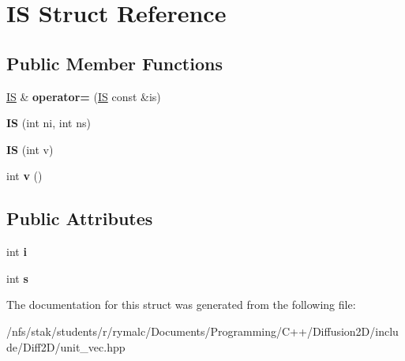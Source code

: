 \hypertarget{structIS}{
\section{IS Struct Reference}
\label{structIS}
}
\subsection*{Public Member Functions}
\begin{DoxyCompactItemize}
\item 
\hypertarget{structIS_aec66c50fd699031a1f617117c67eda11}{
\hyperlink{structIS}{IS} \& {\bfseries operator=} (\hyperlink{structIS}{IS} const \&is)}
\label{structIS_aec66c50fd699031a1f617117c67eda11}

\item 
\hypertarget{structIS_a2cb6d148c70406c11b9508be2cfddd7e}{
{\bfseries IS} (int ni, int ns)}
\label{structIS_a2cb6d148c70406c11b9508be2cfddd7e}

\item 
\hypertarget{structIS_a53883df04399eab305d240898e889271}{
{\bfseries IS} (int v)}
\label{structIS_a53883df04399eab305d240898e889271}

\item 
\hypertarget{structIS_ad474289c5f0f5f5b231cd2067547cc0f}{
int {\bfseries v} ()}
\label{structIS_ad474289c5f0f5f5b231cd2067547cc0f}

\end{DoxyCompactItemize}
\subsection*{Public Attributes}
\begin{DoxyCompactItemize}
\item 
\hypertarget{structIS_ac0a890989ec0d04b8db157583b154c17}{
int {\bfseries i}}
\label{structIS_ac0a890989ec0d04b8db157583b154c17}

\item 
\hypertarget{structIS_a3a4dc37a5dc69fa81e33c5e7115dca71}{
int {\bfseries s}}
\label{structIS_a3a4dc37a5dc69fa81e33c5e7115dca71}

\end{DoxyCompactItemize}


The documentation for this struct was generated from the following file:\begin{DoxyCompactItemize}
\item 
/nfs/stak/students/r/rymalc/Documents/Programming/C++/Diffusion2D/include/Diff2D/unit\_\-vec.hpp\end{DoxyCompactItemize}
